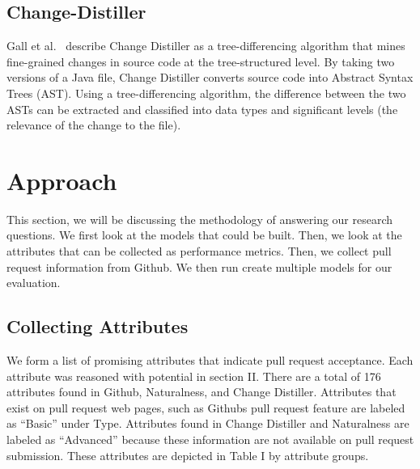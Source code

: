 \documentclass[10pt, conference]{IEEEtran}
\begin{document}
\subsection{Change-Distiller}
Gall et al.~\cite{Gall:2009:CAE:1495795.1495953} describe Change Distiller as a tree-differencing algorithm that mines fine-grained changes in source code at the tree-structured level. By taking two versions of a Java file, Change Distiller converts source code into Abstract Syntax Trees (AST). Using a tree-differencing algorithm, the difference between the two ASTs can be extracted and classified into data types and significant levels (the relevance of the change to the file). 

\section{Approach}
\label{approach}
This section, we will be discussing the methodology of answering our research questions. We first look at the models that could be built. Then, we look at the attributes that can be collected as performance metrics. Then, we collect pull request information from Github. We then run create multiple models for our evaluation.

\subsection{Collecting Attributes}
We form a list of promising attributes that indicate pull request acceptance. Each attribute was reasoned with potential in section II. There are a total of 176 attributes found in Github, Naturalness, and Change Distiller. Attributes that exist on pull request web pages, such as Github\textquotesingle s pull request feature are labeled as \enquote{Basic} under Type. Attributes found in Change Distiller and Naturalness are labeled as \enquote{Advanced} because these information are not available on pull request submission. These attributes are depicted in Table I by attribute groups.
\end{document}
